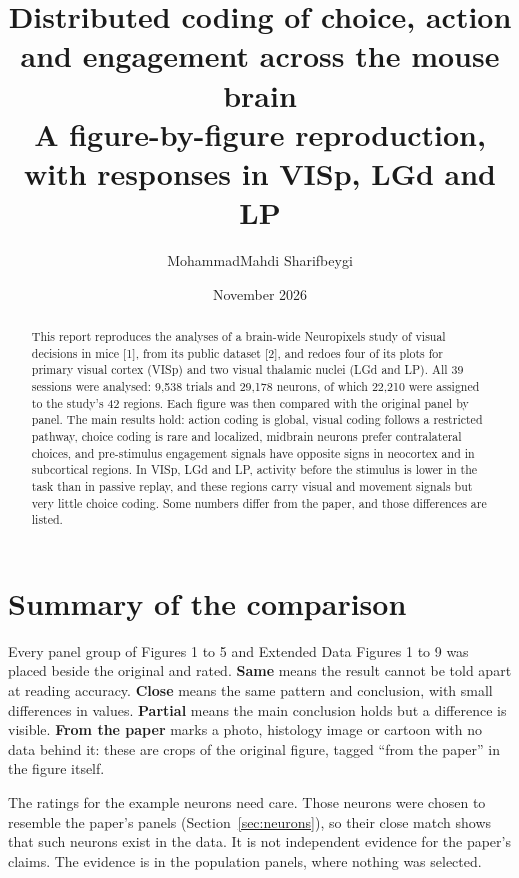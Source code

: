\documentclass[11pt,a4paper]{article}
\title{\textbf{Distributed coding of choice, action and engagement across the mouse brain}\\[2mm]\large A figure-by-figure reproduction, with responses in VISp, LGd and LP}
\author{MohammadMahdi Sharifbeygi}
\date{November 2026}
\begin{document}
\maketitle

\begin{abstract}
This report reproduces the analyses of a brain-wide Neuropixels study of visual decisions in mice [1], from its public dataset [2], and redoes four of its plots for primary visual cortex (VISp) and two visual thalamic nuclei (LGd and LP). All 39 sessions were analysed: 9,538 trials and 29,178 neurons, of which 22,210 were assigned to the study's 42 regions. Each figure was then compared with the original panel by panel. The main results hold: action coding is global, visual coding follows a restricted pathway, choice coding is rare and localized, midbrain neurons prefer contralateral choices, and pre-stimulus engagement signals have opposite signs in neocortex and in subcortical regions. In VISp, LGd and LP, activity before the stimulus is lower in the task than in passive replay, and these regions carry visual and movement signals but very little choice coding. Some numbers differ from the paper, and those differences are listed.
\end{abstract}

\tableofcontents
\newpage

\section{Summary of the comparison}

Every panel group of Figures 1 to 5 and Extended Data Figures 1 to 9 was placed beside the original and rated. \textbf{Same} means the result cannot be told apart at reading accuracy. \textbf{Close} means the same pattern and conclusion, with small differences in values. \textbf{Partial} means the main conclusion holds but a difference is visible. \textbf{From the paper} marks a photo, histology image or cartoon with no data behind it: these are crops of the original figure, tagged ``from the paper'' in the figure itself.

\begin{table}[H]\centering\small

\caption{Agreement with the paper by figure. Ratings are by eye, supported by the numbers in Section~\ref{sec:numbers}.}
\end{table}

The ratings for the example neurons need care. Those neurons were chosen to resemble the paper's panels (Section~\ref{sec:neurons}), so their close match shows that such neurons exist in the data. It is not independent evidence for the paper's claims. The evidence is in the population panels, where nothing was selected.
\end{document}
